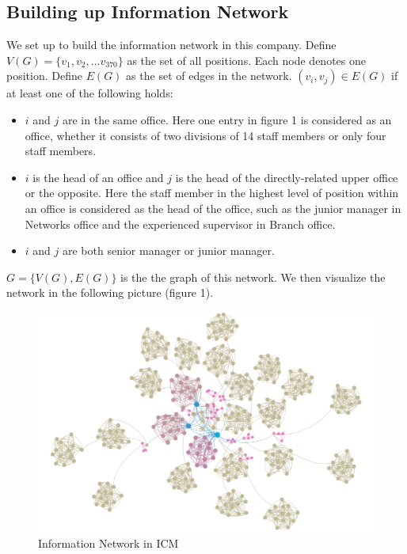 \documentclass[tcn = 37075, sheet = true, abstract = true]{mcmthesis}
\begin{document}
\subsection{Building up Information Network}

We set up to build the information network in this company. Define $V(G)=\{v_1,v_2,...v_{370}\}$ as the set of all positions. Each node denotes one position. Define $E(G)$ as the set of edges in the network. $(v_i,v_j)\in E(G)$ if at least one of the following holds:


\begin{itemize}
\item $i$ and $j$ are in the same office. Here one entry in figure 1 is considered as an office, whether it consists of two divisions of 14 staff members or only four staff members.
\item $i$ is the head of an office and $j$ is the head of the directly-related upper office or the opposite. Here the staff member in the highest level of position within an office is considered as the head of the office, such as the junior manager in Networks office and the experienced supervisor in Branch office.
\item $i$ and $j$ are both senior manager or junior manager.
\end{itemize}

$G=\{V(G),E(G)\}$ is the the graph of this network. We then visualize the network in the following picture (figure 1).

\begin{figure}[htb!]
\small
\centering
\includegraphics[width=14cm]{figure_2.png}
\caption{Information Network in ICM} \label{fig:Information Network in ICM}
\end{figure}
\end{document}
